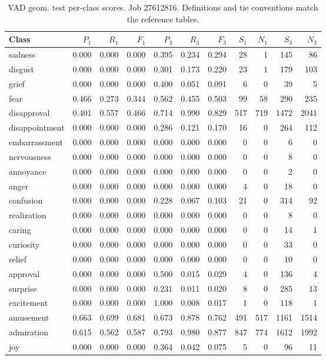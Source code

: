 \begin{table}[!htbp]
\centering
\scriptsize
\setlength{\tabcolsep}{5pt}
\begin{tabular}{lrrrrrrrrrr}
\toprule
Class & $P_1$ & $R_1$ & $F_1$ & $P_3$ & $R_3$ & $F_3$ & $S_1$ & $N_1$ & $S_3$ & $N_3$ \\
\midrule
sadness & 0.000 & 0.000 & 0.000 & 0.395 & 0.234 & 0.294 & 28 & 1 & 145 & 86 \\
disgust & 0.000 & 0.000 & 0.000 & 0.301 & 0.173 & 0.220 & 23 & 1 & 179 & 103 \\
grief & 0.000 & 0.000 & 0.000 & 0.400 & 0.051 & 0.091 & 6 & 0 & 39 & 5 \\
fear & 0.466 & 0.273 & 0.344 & 0.562 & 0.455 & 0.503 & 99 & 58 & 290 & 235 \\
disapproval & 0.401 & 0.557 & 0.466 & 0.714 & 0.990 & 0.829 & 517 & 719 & 1472 & 2041 \\
disappointment & 0.000 & 0.000 & 0.000 & 0.286 & 0.121 & 0.170 & 16 & 0 & 264 & 112 \\
embarrassment & 0.000 & 0.000 & 0.000 & 0.000 & 0.000 & 0.000 & 0 & 0 & 6 & 0 \\
nervousness & 0.000 & 0.000 & 0.000 & 0.000 & 0.000 & 0.000 & 0 & 0 & 8 & 0 \\
annoyance & 0.000 & 0.000 & 0.000 & 0.000 & 0.000 & 0.000 & 0 & 0 & 2 & 0 \\
anger & 0.000 & 0.000 & 0.000 & 0.000 & 0.000 & 0.000 & 4 & 0 & 18 & 0 \\
confusion & 0.000 & 0.000 & 0.000 & 0.228 & 0.067 & 0.103 & 21 & 0 & 314 & 92 \\
realization & 0.000 & 0.000 & 0.000 & 0.000 & 0.000 & 0.000 & 0 & 0 & 8 & 0 \\
caring & 0.000 & 0.000 & 0.000 & 0.000 & 0.000 & 0.000 & 0 & 0 & 14 & 1 \\
curiosity & 0.000 & 0.000 & 0.000 & 0.000 & 0.000 & 0.000 & 0 & 0 & 33 & 0 \\
relief & 0.000 & 0.000 & 0.000 & 0.000 & 0.000 & 0.000 & 0 & 0 & 10 & 0 \\
approval & 0.000 & 0.000 & 0.000 & 0.500 & 0.015 & 0.029 & 4 & 0 & 136 & 4 \\
surprise & 0.000 & 0.000 & 0.000 & 0.231 & 0.011 & 0.020 & 8 & 0 & 285 & 13 \\
excitement & 0.000 & 0.000 & 0.000 & 1.000 & 0.008 & 0.017 & 1 & 0 & 118 & 1 \\
amusement & 0.663 & 0.699 & 0.681 & 0.673 & 0.878 & 0.762 & 491 & 517 & 1161 & 1514 \\
admiration & 0.615 & 0.562 & 0.587 & 0.793 & 0.980 & 0.877 & 847 & 774 & 1612 & 1992 \\
joy & 0.000 & 0.000 & 0.000 & 0.364 & 0.042 & 0.075 & 5 & 0 & 96 & 11 \\
\bottomrule
\end{tabular}
\caption{VAD geom. test per-class scores. Job 27612816. Definitions and tie conventions match the reference tables.}
\label{tab:classes-b_vad_geometry}
\end{table}
